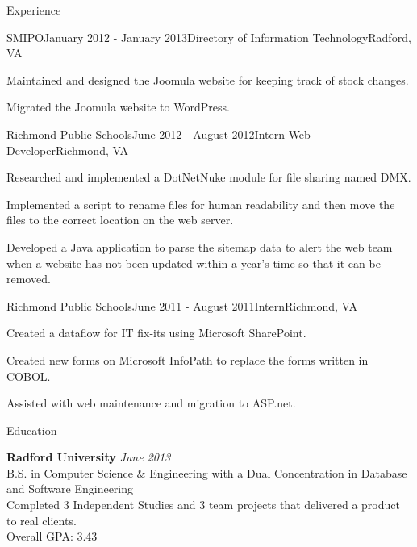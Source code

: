 \documentclass{resume} %
\begin{document}
\begin{rSection}{Experience}

\begin{rSubsection}{SMIPO}{January 2012 - January 2013}{Directory of Information Technology}{Radford, VA}
\item Maintained and designed the Joomula website for keeping track of stock changes.
\item Migrated the Joomula website to WordPress.
\end{rSubsection}


\begin{rSubsection}{Richmond Public Schools}{June 2012 - August 2012}{Intern Web Developer}{Richmond, VA}
\item Researched and implemented a DotNetNuke module for file sharing named DMX.
\item Implemented a script to rename files for human readability and then move the files to the correct location on the web server.
\item Developed a Java application to parse the sitemap data to alert the web team when a website has not been updated within a year's time so that it can be removed.
\end{rSubsection}


\begin{rSubsection}{Richmond Public Schools}{June 2011 - August 2011}{Intern}{Richmond, VA}
\item Created a dataflow for IT fix-its using Microsoft SharePoint.
\item Created new forms on Microsoft InfoPath to replace the forms written in COBOL.
\item Assisted with web maintenance and migration to ASP.net.
\end{rSubsection}

\end{rSection}


\begin{rSection}{Education}

{\bf Radford University} \hfill {\em June 2013} \\ 
B.S. in Computer Science \& Engineering with a Dual Concentration in Database and Software Engineering \\
Completed 3 Independent Studies and 3 team projects that delivered a product to real clients. \\
Overall GPA: 3.43

\end{rSection}
\end{document}
